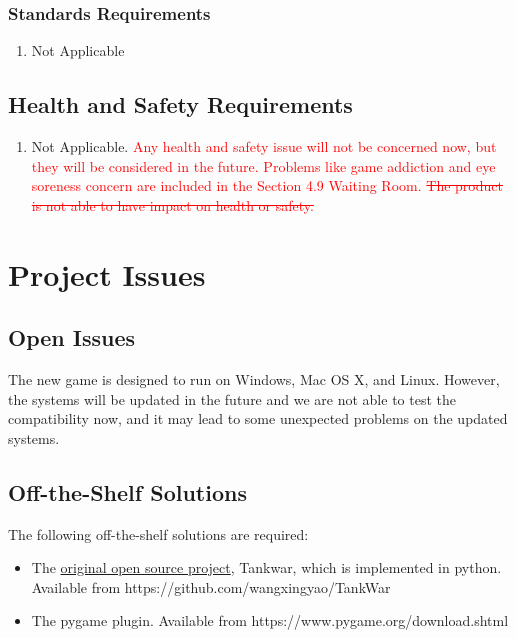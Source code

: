 \documentclass[12pt, titlepage]{article}
\begin{document}
\subsubsection{Standards Requirements}
\label{ssub:standards_requirements}
\begin{enumerate}[{LR}2. ]
	\item Not Applicable
\end{enumerate}

\subsection{Health and Safety Requirements}
\label{ssub:health_and_safety_requirements}
\begin{enumerate}[{HS}1. ]
	\item Not Applicable. \textcolor{red}{Any health and safety issue will not be concerned now, but they will be considered in the future. Problems like game addiction and eye soreness concern are included in the Section 4.9 Waiting Room. \sout{The product is not able to have impact on health or safety.}}
\end{enumerate}


\section{Project Issues}

\subsection{Open Issues}
The new game is designed to run on Windows, Mac OS X, and Linux. However, the systems will be updated in the future and we are not able to test the compatibility now, and it may lead to some unexpected problems on the updated systems.
\subsection{Off-the-Shelf Solutions}
The following off-the-shelf solutions are required:
\begin{itemize}
\item The \underline{original open source project}, Tankwar, which is implemented in python. Available from https://github.com/wangxingyao/TankWar
\item The pygame plugin. Available from https://www.pygame.org/download.shtml
\end{itemize}
\end{document}
